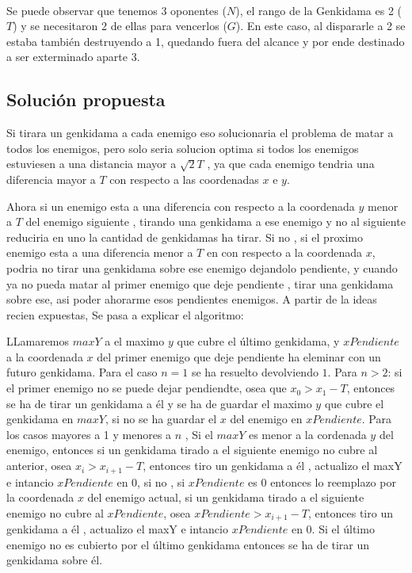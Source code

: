 	~

	Se puede observar que tenemos 3 oponentes ($N$), el rango de la
	Genkidama es 2 ($T$) y se necesitaron 2 de ellas para vencerlos ($G$). En este caso, al
	dispararle a 2 se estaba también destruyendo a 1, quedando fuera del alcance
	y por ende destinado a ser exterminado aparte 3.

    \subsection{Solución propuesta}
        Si tirara un genkidama a cada enemigo eso solucionaria el problema de matar a todos los enemigos, pero solo seria solucion optima si todos los enemigos estuviesen a una distancia mayor a $\sqrt{2}T$ , ya que cada enemigo tendria una diferencia mayor a $T$ con respecto a las coordenadas $x$ e $y$. 

        Ahora si un enemigo esta a una diferencia con respecto a la coordenada $y$ menor a $T$ del enemigo siguiente , tirando una genkidama a ese enemigo y no al siguiente reduciria en uno la cantidad de genkidamas ha tirar. Si no , si el proximo enemigo esta a una diferencia menor a $T$ en con respecto a la coordenada $x$, podria no tirar una genkidama sobre ese enemigo dejandolo pendiente, y cuando ya no pueda matar al primer enemigo que deje pendiente , tirar una genkidama sobre ese, asi poder ahorarme esos pendientes enemigos. A partir de la ideas recien expuestas, Se pasa a explicar el algoritmo:  


        LLamaremos $maxY$ a el maximo $y$ que cubre el último genkidama, y $xPendiente$ a la coordenada $x$ del primer enemigo que deje pendiente ha eleminar con un futuro genkidama.
        Para el caso $n = 1$ se ha resuelto devolviendo $1$. Para $n > 2$: si el primer enemigo no se puede dejar pendiendte, osea que $x_0 > x_1  - T$, entonces se ha de tirar un genkidama a él y se ha de guardar el maximo $y$ que cubre el genkidama en $maxY$, si no se ha guardar el $x$ del enemigo en $xPendiente$. Para los casos mayores a 1 y menores a $n$ , Si el $maxY$ es menor a la cordenada $y$ del enemigo, entonces si un genkidama tirado a el siguiente enemigo no cubre al anterior, osea $x_i > x_{i+1} - T$,  entonces tiro un genkidama a él , actualizo el maxY e intancio $xPendiente$ en $0$, si no , si $xPendiente$ es $0$ entonces lo reemplazo por la coordenada $x$ del enemigo actual, si un genkidama tirado a el siguiente enemigo no cubre al $xPendiente$, osea  $xPendiente > x_{i+1} - T$, entonces tiro un genkidama a él , actualizo el maxY e intancio $xPendiente$ en $0$. Si el último enemigo no es cubierto por el último genkidama entonces se ha de tirar un genkidama sobre él.

